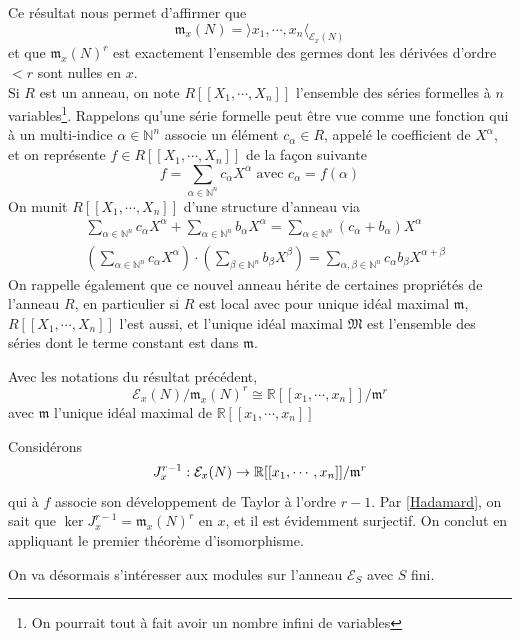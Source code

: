 \documentclass[memoire.tex]{subfiles}
\begin{document}
Ce résultat nous permet d'affirmer que 
\begin{equation}\label{Hadamard-corr}
    \mathfrak{m}_x(N)=\rangle x_1,\cdots,x_n \langle_
    {\mathcal{E}_x(N)}
\end{equation}
et que $\mathfrak{m}_x(N)^r$ est exactement l'ensemble des germes
dont les dérivées d'ordre $<r$ sont nulles en $x$.\\
Si $R$ est un  anneau, on note $R[[X_1,\cdots,X_n]]$ 
l'ensemble 
des séries formelles à $n$ variables\footnote{ On pourrait 
tout à fait avoir un nombre infini de variables}. Rappelons 
qu'une série formelle peut être vue comme une fonction qui 
à un  
multi-indice $\alpha\in\mathbb{N}^n$ associe un  élément 
$c_{\alpha}\in R$, appelé le coefficient de $X^{\alpha}$, et 
on représente $f\in R[[X_1,\cdots,X_n]]$ de la façon 
suivante
\begin{equation*}
    f=\sum_{\alpha\in\mathbb{N}^n} c_{\alpha}X^{\alpha}\text
    { avec } c_{\alpha}=f(\alpha)
\end{equation*}
On munit $R[[X_1,\cdots,X_n]]$ d'une structure d'anneau via 
\begin{align*}
    &\sum_{\alpha\in\mathbb{N}^n} c_{\alpha}X^{\alpha}+\sum_
    {\alpha\in\mathbb{N}^n} b_{\alpha}X^{\alpha}= \sum_
    {\alpha\in\mathbb{N}^n}(c_{\alpha}+b_{\alpha})X^{\alpha}
    \\
    &(\sum_{\alpha\in\mathbb{N}^n} c_{\alpha}X^{\alpha})
    \cdot (\sum_{\beta\in\mathbb{N}^n} b_{\beta}X^{\beta})
    =\sum_{\alpha,\beta\in\mathbb{N}^n}c_{\alpha}b_{\beta}X^
    {\alpha+\beta}
\end{align*}
On rappelle également que ce nouvel anneau hérite de 
certaines propriétés de l'anneau $R$, en particulier si $R$ 
est local avec pour unique idéal maximal $\mathfrak{m}$, $R[[X_1,\cdots,X_n]]$ l'est aussi, et l'unique 
idéal maximal $\mathfrak{M}$ est l'ensemble des séries dont 
le terme constant est dans $\mathfrak{m}$.

\begin{corollaire}\label{Isopoly}
    Avec les notations du résultat précédent, 
    \begin{equation*}
        \mathcal{E}_x(N)/\mathfrak{m}_x(N)^r\cong \mathbb{R}
        [[x_1,\cdots,x_n]]/\mathfrak{m}^r
    \end{equation*}
    avec $\mathfrak{m}$ l'unique idéal maximal de $\mathbb{R}
    [[x_1,\cdots,x_n]]$
\end{corollaire}
\begin{preuve}
    Considérons 
    \begin{equation*}
        J_{x}^{r-1}: \mathcal{E}_x(N)\rightarrow \mathbb{R}[[x_1,\cdots,x_n]]/\mathfrak{m}^r
    \end{equation*}
    qui à $f$ associe son développement de Taylor à l'ordre 
    $r-1$. Par \ref{Hadamard}, on sait que $\ker J_{x}^{r-1}
    =\mathfrak{m}_x(N)^r$ en $x$, et il est évidemment surjectif. On conclut en appliquant le premier théorème d'isomorphisme.
\end{preuve}
On va désormais s'intéresser aux modules sur l'anneau $\mathcal{E}_S$ avec $S$ fini. 
\end{document}

